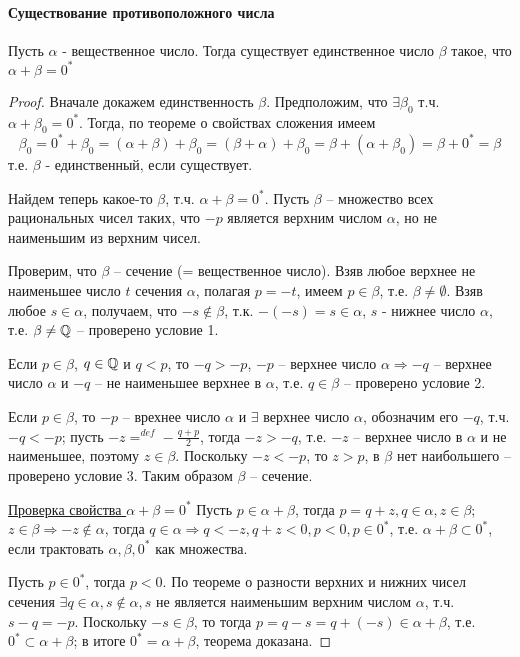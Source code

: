 \documentclass[main]{subfiles}
\begin{document}
\paragraph{Существование противоположного числа}
\begin{theorem}
    Пусть $\alpha$ - вещественное число. Тогда существует единственное число 
    $\beta$ такое, что $\alpha + \beta = 0^*$
\end{theorem}
\begin{proof}
    Вначале докажем единственность $\beta$. Предположим, что $\exists \beta_0$ т.ч.
    $\alpha + \beta_0 = 0^*$. Тогда, по теореме о свойствах сложения имеем
    \[
        \beta_0 = 0^* + \beta_0 = (\alpha + \beta) + \beta_0 = (\beta + \alpha) +
        \beta_0 = \beta + (\alpha + \beta_0) = \beta + 0^* = \beta  
    \]
    т.е. $\beta$ - единственный, если существует.

    Найдем теперь какое-то $\beta$, т.ч. $\alpha + \beta = 0^*$. Пусть $\beta$ --
    множество всех рациональных чисел таких, что $-p$ является верхним числом 
    $\alpha$, но не наименьшим из верхним чисел.
    
    Проверим, что $\beta$ -- сечение (= вещественное число). Взяв любое верхнее не
    наименьшее число $t$ сечения $\alpha$, полагая $p = -t$, имеем $p \in \beta$,
    т.е. $\beta \neq \emptyset$. Взяв любое $s \in \alpha$, получаем, что 
    $-s \notin \beta$, т.к. $-(-s) = s \in \alpha$, $s$ - нижнее число $\alpha$,
    т.е. $\beta \neq \mathbb{Q}$ -- проверено условие 1.

    Если $p \in \beta$, $q \in \mathbb{Q}$ и $q < p$, то $-q > -p$, $-p$ -- верхнее число
    $\alpha \Rightarrow -q$ -- верхнее число $\alpha$ и $-q$ -- не наименьшее
    верхнее в $\alpha$, т.е. $q \in \beta$ -- проверено условие 2.
    
    Если $p \in \beta$, то $-p$ -- врехнее число $\alpha$ и $\exists$ верхнее число
    $\alpha$, обозначим его $-q$, т.ч. $-q < -p$; пусть $-z=^{def}-\frac{q + p}{2}$,
    тогда $-z > -q$, т.е. $-z$ -- верхнее число в $\alpha$ и не наименьшее, поэтому
    $z \in \beta$. Поскольку $-z < -p$, то $z > p$, в $\beta$ нет наибольшего --
    проверено условие 3. Таким образом $\beta$ -- сечение.

    \underline{Проверка свойства $\alpha + \beta = 0^*$}
    Пусть $p \in \alpha + \beta$, тогда $p = q + z, q \in \alpha, z \in \beta$;
    $z \in \beta \Rightarrow -z \notin \alpha$, тогда $q \in \alpha \Rightarrow
    q < -z, q + z < 0, p < 0, p \in 0^*$, т.е. $\alpha + \beta \subset 0^*$, 
    если трактовать $\alpha, \beta, 0^*$ как множества.

    Пусть $p \in 0^*$, тогда $p < 0$. По теореме о разности верхних и нижних 
    чисел сечения $\exists q \in \alpha, s \notin \alpha, s$ не является наименьшим
    верхним числом $\alpha$, т.ч. $s - q = -p$. Поскольку $-s \in \beta$, то тогда
    $p = q - s = q + (-s) \in \alpha + \beta$, т.е. $0^* \subset \alpha + \beta$;
    в итоге $0^* = \alpha + \beta$, теорема доказана.
\end{proof}
\end{document}
